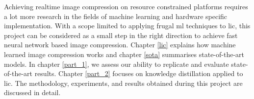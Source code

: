 Achieving realtime image compression on resource constrained platforms requires a lot more research in the fields of machine learning and hardware specific implementation. With a scope limited to applying frugal \acrshort{ml} techniques to \acrshort{lic}, this project can be considered as a small step in the right direction to achieve fast neural network based image compression. Chapter \ref{lic} explains how machine learned image compression works and chapter \ref{sota} summarises state-of-the-art models. In chapter \ref{part_1}, we assess our ability to replicate and evaluate state-of-the-art results. Chapter \ref{part_2} focuses on knowledge distillation applied to \acrshort{lic}. The methodology, experiments, and results obtained during this project are discussed in detail.